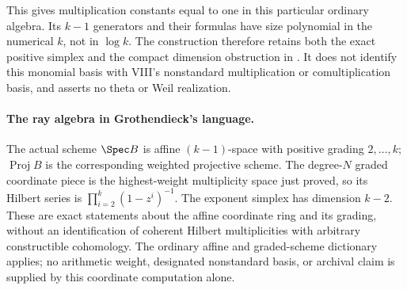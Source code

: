 This gives multiplication constants equal to one in this particular
ordinary algebra. Its $k-1$ generators and their formulas have size
polynomial in the numerical $k$, not in $\log k$. The construction
therefore retains both the exact positive simplex and the compact
dimension obstruction in . It does not identify this
monomial basis with VIII's nonstandard multiplication or
comultiplication basis, and asserts no theta or Weil realization.

\paragraph{The ray algebra in Grothendieck's language.}
The actual scheme $\Spec B$ is affine $(k-1)$-space with positive
grading $2,\ldots,k$; $\operatorname{Proj}B$ is the corresponding
weighted projective scheme. The degree-$N$ graded coordinate piece
is the highest-weight multiplicity space just proved, so its Hilbert
series is $\prod_{i=2}^k(1-z^i)^{-1}$. The exponent simplex has
dimension $k-2$. These are exact statements about the affine
coordinate ring and its grading, without an identification of
coherent Hilbert multiplicities with arbitrary constructible
cohomology. The ordinary affine and graded-scheme dictionary applies;
no arithmetic weight, designated nonstandard basis, or archival
claim is supplied by this coordinate computation alone.
